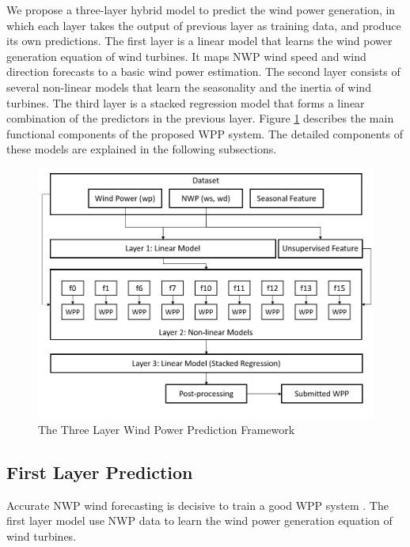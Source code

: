 \documentclass[conference]{IEEEtran}
\begin{document}
We propose a three-layer hybrid model to predict the wind power generation, in which each layer takes the output of previous layer as training data, and produce its own predictions. The first layer is a linear model that learns the wind power generation equation of wind turbines. It maps NWP wind speed and wind direction forecasts to a basic wind power estimation. The second layer consists of several non-linear models that learn the seasonality and the inertia of wind turbines. The third layer is a stacked regression model that forms a linear combination of the predictors in the previous layer. Figure \ref{fig:flowchart} describes the main functional components of the proposed WPP system. The detailed components of these models are explained in the following subsections. 
\begin{figure}
\centering
\includegraphics[width=0.9\columnwidth]{FIG/flowchart}
\caption{The Three Layer Wind Power Prediction Framework}
\label{fig:flowchart}
\end{figure}

\subsection{First Layer Prediction}
Accurate NWP wind forecasting is decisive to train a good WPP system \cite{WANG20171345}. The first layer model use NWP data to learn the wind power generation equation of wind turbines. 
\end{document}
